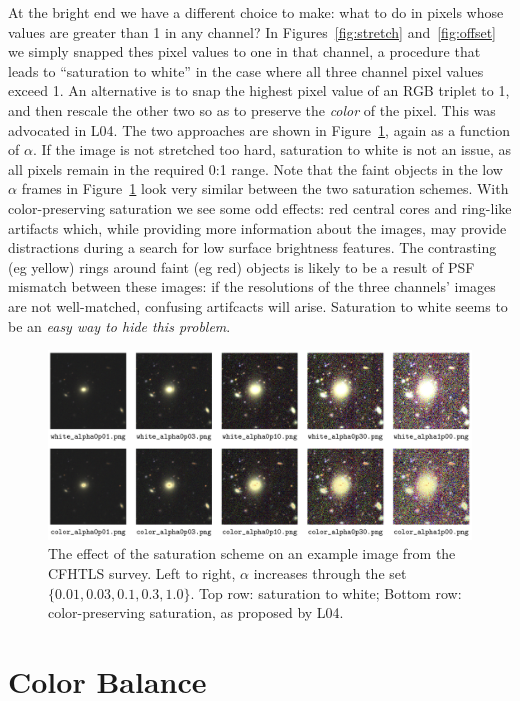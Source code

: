 \documentclass[letterpaper, 11pt]{article}
\begin{document}
At the bright end we have a different choice to make: what to do in pixels
whose values are greater than 1 in any channel? In Figures~\ref{fig:stretch}
and~\ref{fig:offset} we simply snapped thes pixel values to one in that
channel, a procedure that leads to ``saturation to white'' in the case where
all three channel pixel values exceed 1. An alternative is to snap the highest
pixel value of an RGB triplet to 1, and then rescale the other two so as to
preserve the {\it color} of the pixel. This was advocated in L04. The two
approaches are shown in Figure~\ref{fig:saturation}, again as a function of
$\alpha$. If the image is not stretched too hard, saturation to white is not
an issue, as all pixels remain in the required 0:1 range. Note that the faint
objects in the low $\alpha$ frames in Figure~\ref{fig:saturation} look very
similar between the two saturation schemes. With
color-preserving saturation we see some odd effects: red central cores and
ring-like artifacts which, while providing more information about the images,
may provide distractions during a search for low surface brightness features. 
The contrasting (eg yellow) rings around faint (eg red) objects is likely to
be a result of PSF mismatch between these images: if the resolutions of the
three channels' images are not well-matched, confusing artifcacts will arise.
Saturation to white seems to be an {\it easy way to hide this problem}.

\begin{figure}
\centering\includegraphics[width=0.9\linewidth]{Images/CFHTLS_27_saturation_gallery.png}
\caption{The effect of the saturation scheme on an
example image from the CFHTLS survey. Left to right, $\alpha$ increases
through the set $\{0.01,0.03,0.1,0.3,1.0\}$. Top row: saturation to white;
Bottom row: color-preserving saturation, as proposed by L04.}
\label{fig:saturation}
\end{figure}


\section{Color Balance}
\label{sec:color}
\end{document}
